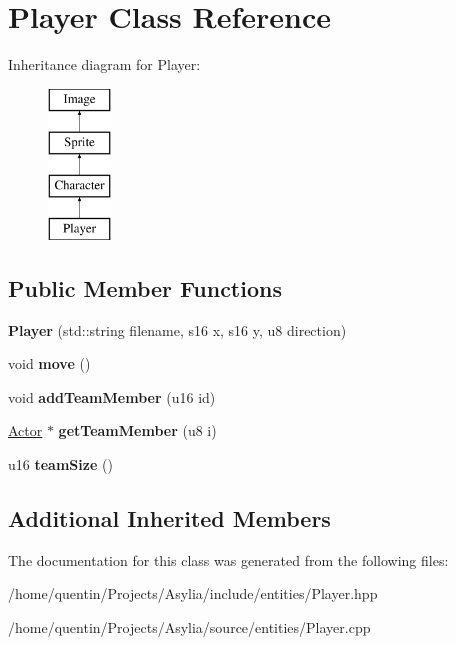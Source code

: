 \hypertarget{classPlayer}{\section{Player Class Reference}
\label{classPlayer}
}
Inheritance diagram for Player\-:\begin{figure}[H]
\begin{center}
\leavevmode
\includegraphics[height=4.000000cm]{classPlayer}
\end{center}
\end{figure}
\subsection*{Public Member Functions}
\begin{DoxyCompactItemize}
\item 
\hypertarget{classPlayer_a36ce5c199bdbb064ae6c366aa809667d}{{\bfseries Player} (std\-::string filename, s16 x, s16 y, u8 direction)}\label{classPlayer_a36ce5c199bdbb064ae6c366aa809667d}

\item 
\hypertarget{classPlayer_ae02ee46d8c20dd0697b975f935b09839}{void {\bfseries move} ()}\label{classPlayer_ae02ee46d8c20dd0697b975f935b09839}

\item 
\hypertarget{classPlayer_a87cf2ed24622b893c95fafc0fe7b690b}{void {\bfseries add\-Team\-Member} (u16 id)}\label{classPlayer_a87cf2ed24622b893c95fafc0fe7b690b}

\item 
\hypertarget{classPlayer_af0c2183a1d68d82104065a8e1671437c}{\hyperlink{classActor}{Actor} $\ast$ {\bfseries get\-Team\-Member} (u8 i)}\label{classPlayer_af0c2183a1d68d82104065a8e1671437c}

\item 
\hypertarget{classPlayer_aa0b58cbbe1676b94136381a8a10131c1}{u16 {\bfseries team\-Size} ()}\label{classPlayer_aa0b58cbbe1676b94136381a8a10131c1}

\end{DoxyCompactItemize}
\subsection*{Additional Inherited Members}


The documentation for this class was generated from the following files\-:\begin{DoxyCompactItemize}
\item 
/home/quentin/\-Projects/\-Asylia/include/entities/Player.\-hpp\item 
/home/quentin/\-Projects/\-Asylia/source/entities/Player.\-cpp\end{DoxyCompactItemize}
